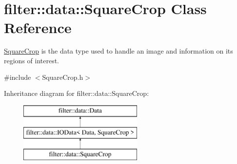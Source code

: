 \hypertarget{classfilter_1_1data_1_1_square_crop}{}\section{filter\+:\+:data\+:\+:Square\+Crop Class Reference}
\label{classfilter_1_1data_1_1_square_crop}


\hyperlink{classfilter_1_1data_1_1_square_crop}{Square\+Crop} is the data type used to handle an image and information on its regions of interest.  




{\ttfamily \#include $<$Square\+Crop.\+h$>$}

Inheritance diagram for filter\+:\+:data\+:\+:Square\+Crop\+:\begin{figure}[H]
\begin{center}
\leavevmode
\includegraphics[height=3.000000cm]{d0/d9d/classfilter_1_1data_1_1_square_crop}
\end{center}
\end{figure}
